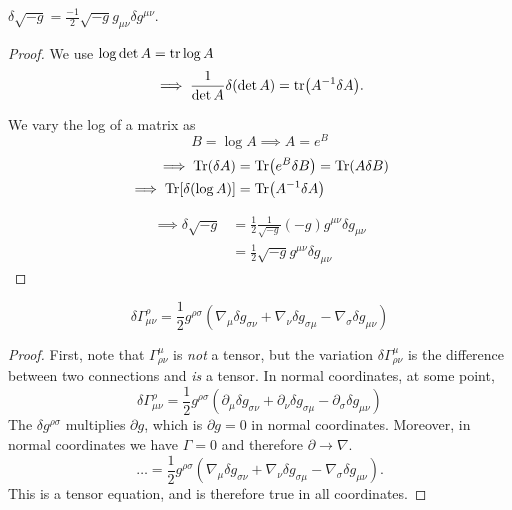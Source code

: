 \begin{claim}
  $\delta \sqrt{-g} = \frac{-1}{2} \sqrt{-g} g_{\mu\nu} \delta g^{\mu\nu}$.
\end{claim}
\begin{proof}
  We use $\log \det A = \tr \log A$
  \begin{equation}
    \implies \frac{1}{\det A} \delta(\det A) = \tr(A^{-1} \delta A).
  \end{equation}
  \begin{leftbar}
    \begin{remark}
      We vary the log of a matrix as
      \begin{equation}
        B = \log A \implies A = e^{B}
      \end{equation}
      \begin{align}
	\implies \Tr(\delta A) &= \Tr(e^{B} \delta B) = \Tr(A \delta B) \\
	\implies \Tr [\delta (\log A)] &= \Tr(A^{-1} \delta A)
      \end{align}
    \end{remark}
  \end{leftbar}
    \begin{align}
      \implies \delta \sqrt{-g} &= \frac{1}{2} \frac{1}{\sqrt{-g}} (-g) g^{\mu\nu} \delta g_{\mu\nu} \\
				&= \frac{1}{2} \sqrt{-g} g^{\mu\nu} \delta g_{\mu\nu}
    \end{align}
\end{proof}

\begin{claim}
  \begin{equation}
  \delta \Gamma^{\rho}_{\mu\nu} = \frac{1}{2} g^{\rho\sigma} (\nabla_{\mu} \delta g_{\sigma\nu} + \nabla_{\nu} \delta g_{\sigma\mu} - \nabla_{\sigma} \delta g_{\mu\nu})
  \end{equation}
\end{claim}
\begin{proof}
  First, note that $\Gamma^{\mu}_{\rho\nu}$ is \emph{not} a tensor, but the variation $\delta \Gamma^{\mu}_{\rho\nu}$ is the difference between two connections and \emph{is} a tensor.
  In normal coordinates, at some point, 
  \begin{equation}
    \delta\Gamma^{\rho}_{\mu\nu} = \frac{1}{2} g^{\rho\sigma} (\partial_{\mu} \delta g_{\sigma\nu} + \partial_{\nu} \delta g_{\sigma\mu} - \partial_{\sigma} \delta g_{\mu\nu})
  \end{equation}
  The $\delta g^{\rho\sigma}$ multiplies $\partial g$, which is $\partial g = 0$ in normal coordinates.
  Moreover, in normal coordinates we have $\Gamma = 0$ and therefore $\partial \to \nabla$.
  \begin{equation}
    \dots = \frac{1}{2} g^{\rho\sigma} (\nabla_{\mu} \delta g_{\sigma\nu} + \nabla_{\nu} \delta g_{\sigma\mu} - \nabla_{\sigma} \delta g_{\mu\nu}).
  \end{equation}
  This is a tensor equation, and is therefore true in all coordinates.
\end{proof}

